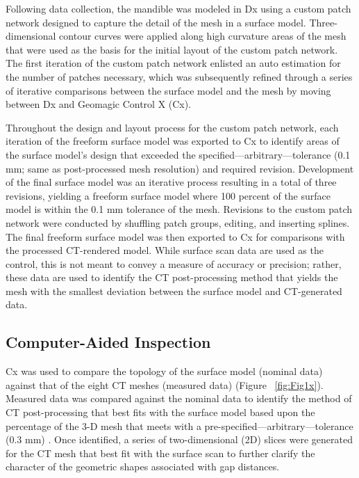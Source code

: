 \documentclass[review]{elsarticle}
\begin{document}
Following data collection, the mandible was modeled in Dx using a custom patch network designed to capture the detail of the mesh in a surface model. Three-dimensional contour curves were applied along high curvature areas of the mesh that were used as the basis for the initial layout of the custom patch network. The first iteration of the custom patch network enlisted an auto estimation for the number of patches necessary, which was subsequently refined through a series of iterative comparisons between the surface model and the mesh by moving between Dx and Geomagic Control X (Cx).

Throughout the design and layout process for the custom patch network, each iteration of the freeform surface model was exported to Cx to identify areas of the surface model's design that exceeded the specified---arbitrary---tolerance (0.1 mm; same as post-processed mesh resolution) and required revision. Development of the final surface model was an iterative process resulting in a total of three revisions, yielding a freeform surface model where 100 percent of the surface model is within the  0.1 mm tolerance of the mesh. Revisions to the custom patch network were conducted by shuffling patch groups, editing, and inserting splines. The final freeform surface model was then exported to Cx for comparisons with the processed CT-rendered model. While surface scan data are used as the control, this is not meant to convey a measure of accuracy or precision; rather, these data are used to identify the CT post-processing method that yields the mesh with the smallest deviation between the surface model and CT-generated data.

\subsection{Computer-Aided Inspection}

Cx was used to compare the topology of the surface model (nominal data) against that of the eight CT meshes (measured data) \citep{RN11473,sj2021} (Figure ~\ref{fig:Fig1x}). Measured data was compared against the nominal data \citep{RN11463,RN5923,RN11460,RN11465} to identify the method of CT post-processing that best fits with the surface model based upon the percentage of the 3-D mesh that meets with a pre-specified---arbitrary---tolerance (0.3 mm) \citep{RN5925,RN11471,RN11455}. Once identified, a series of two-dimensional (2D) slices were generated for the CT mesh that best fit with the surface scan to further clarify the character of the geometric shapes associated with gap distances.
\end{document}
